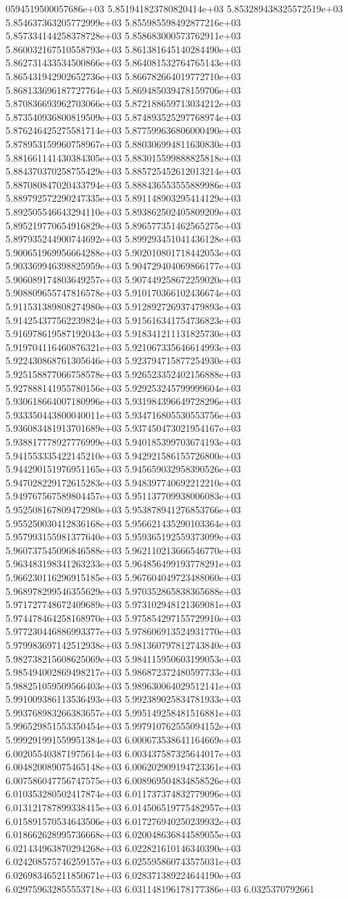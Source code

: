 0594519500057686e+03	5.851941823780820414e+03	5.853289438325572519e+03	5.854637363205772999e+03	5.855985598492877216e+03	5.857334144258378728e+03	5.858683000573762911e+03	5.860032167510558793e+03	5.861381645140284490e+03	5.862731433534500866e+03	5.864081532764765143e+03	5.865431942902652736e+03	5.866782664019772710e+03	5.868133696187727764e+03	5.869485039478159706e+03	5.870836693962703066e+03	5.872188659713034212e+03	5.873540936800819509e+03	5.874893525297768974e+03	5.876246425275581714e+03	5.877599636806000490e+03	5.878953159960758967e+03	5.880306994811630830e+03	5.881661141430384305e+03	5.883015599888825818e+03	5.884370370258755429e+03	5.885725452612013214e+03	5.887080847020433794e+03	5.888436553555889986e+03	5.889792572290247335e+03	5.891148903295414129e+03	5.892505546643294110e+03	5.893862502405809209e+03	5.895219770654916829e+03	5.896577351462565275e+03	5.897935244900744692e+03	5.899293451041436128e+03	5.900651969956664288e+03	5.902010801718442053e+03	5.903369946398825959e+03	5.904729404069866177e+03	5.906089174803649257e+03	5.907449258672259020e+03	5.908809655747816578e+03	5.910170366102436674e+03	5.911531389808274980e+03	5.912892726937479893e+03	5.914254377562239824e+03	5.915616341754736823e+03	5.916978619587192043e+03	5.918341211131825730e+03	5.919704116460876321e+03	5.921067335646614993e+03	5.922430868761305646e+03	5.923794715877254930e+03	5.925158877066758578e+03	5.926523352402156888e+03	5.927888141955780156e+03	5.929253245799999604e+03	5.930618664007180996e+03	5.931984396649728296e+03	5.933350443800040011e+03	5.934716805530553756e+03	5.936083481913701689e+03	5.937450473021954167e+03	5.938817778927776999e+03	5.940185399703674193e+03	5.941553335422145210e+03	5.942921586155726800e+03	5.944290151976951165e+03	5.945659032958390526e+03	5.947028229172615283e+03	5.948397740692212210e+03	5.949767567589804457e+03	5.951137709938006083e+03	5.952508167809472980e+03	5.953878941276853766e+03	5.955250030412836168e+03	5.956621435290103364e+03	5.957993155981377640e+03	5.959365192559373099e+03	5.960737545096846588e+03	5.962110213666546770e+03	5.963483198341263233e+03	5.964856499193778291e+03	5.966230116296915185e+03	5.967604049723488060e+03	5.968978299546355629e+03	5.970352865838365688e+03	5.971727748672409689e+03	5.973102948121369081e+03	5.974478464258168970e+03	5.975854297155729910e+03	5.977230446886993377e+03	5.978606913524931770e+03	5.979983697142512938e+03	5.981360797812743840e+03	5.982738215608625069e+03	5.984115950603199053e+03	5.985494002869498217e+03	5.986872372480597733e+03	5.988251059509566403e+03	5.989630064029512141e+03	5.991009386113536493e+03	5.992389025834781933e+03	5.993768983266383657e+03	5.995149258481516881e+03	5.996529851553350454e+03	5.997910762555094152e+03	5.999291991559951384e+03	6.000673538641164669e+03	6.002055403871975614e+03	6.003437587325644017e+03	6.004820089075465148e+03	6.006202909194723361e+03	6.007586047756747575e+03	6.008969504834858526e+03	6.010353280502417874e+03	6.011737374832779096e+03	6.013121787899338415e+03	6.014506519775482957e+03	6.015891570534643506e+03	6.017276940250239932e+03	6.018662628995736668e+03	6.020048636844589055e+03	6.021434963870294268e+03	6.022821610146340390e+03	6.024208575746259157e+03	6.025595860743575031e+03	6.026983465211850671e+03	6.028371389224644190e+03	6.029759632855553718e+03	6.031148196178177386e+03	6.0325370792661